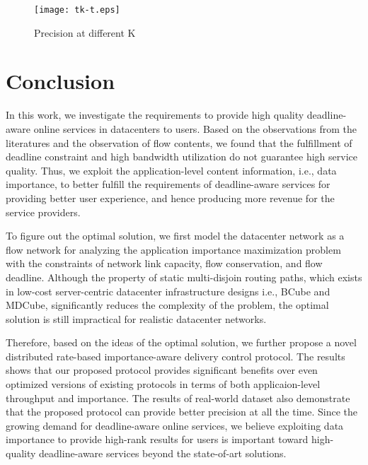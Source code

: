 \documentclass[conference]{IEEEtran}
\begin{document}
\begin{figure}
  \centering
  \texttt{[image: tk-t.eps]}\\
  \caption{Precision at different K}\label{fig:topk_t}
\end{figure}

\section{Conclusion}
In this work, we investigate the requirements to provide high quality deadline-aware online services in datacenters to users. Based on the observations from the literatures\cite{lagun2011viewser, buscher2010good, cutrell2007you, lorigo2008eye} and the observation of flow contents, we found that the fulfillment of deadline constraint and high bandwidth utilization do not guarantee high service quality. Thus, we exploit the application-level content information, i.e., data importance, to better fulfill the requirements of deadline-aware services for providing better user experience, and hence producing more revenue for the service providers.

To figure out the optimal solution, we first model the datacenter network as a flow network for analyzing the application importance maximization problem with the constraints of network link capacity, flow conservation, and flow deadline. Although the property of static multi-disjoin routing paths, which exists in low-cost server-centric datacenter infrastructure designs i.e., BCube\cite{bcube} and MDCube\cite{mdcube}, significantly reduces the complexity of the problem, the optimal solution is still impractical for realistic datacenter networks.


Therefore, based on the ideas of the optimal solution, we further propose a novel distributed rate-based importance-aware delivery control protocol. The results shows that our proposed protocol provides significant benefits over even optimized versions of existing protocols in terms of both applicaion-level throughput and importance. The results of real-world dataset also demonstrate that the proposed protocol can provide better precision at  all the time. Since the growing demand for deadline-aware online services, we believe exploiting data importance to provide high-rank results for users is important toward high-quality deadline-aware services beyond the state-of-art solutions.
\end{document}
